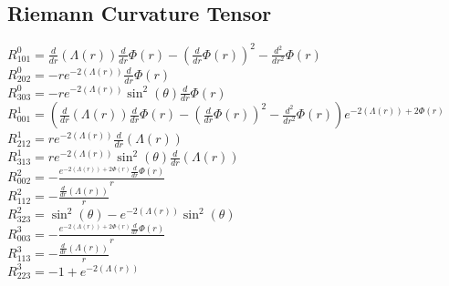 \documentclass{article}
\begin{document}
\subsection*{Riemann Curvature Tensor}
$R^0_{101}=\frac{d}{d r} \left(\Lambda{\left(r \right)}\right) \frac{d}{d r} \Phi{\left(r \right)} - \left(\frac{d}{d r} \Phi{\left(r \right)}\right)^{2} - \frac{d^{2}}{d r^{2}} \Phi{\left(r \right)}$\\
$R^0_{202}=- r e^{- 2 \left(\Lambda{\left(r \right)}\right)} \frac{d}{d r} \Phi{\left(r \right)}$\\
$R^0_{303}=- r e^{- 2 \left(\Lambda{\left(r \right)}\right)} \sin^{2}{\left(\theta \right)} \frac{d}{d r} \Phi{\left(r \right)}$\\
$R^1_{001}=\left(\frac{d}{d r} \left(\Lambda{\left(r \right)}\right) \frac{d}{d r} \Phi{\left(r \right)} - \left(\frac{d}{d r} \Phi{\left(r \right)}\right)^{2} - \frac{d^{2}}{d r^{2}} \Phi{\left(r \right)}\right) e^{- 2 \left(\Lambda{\left(r \right)}\right) + 2 \Phi{\left(r \right)}}$\\
$R^1_{212}=r e^{- 2 \left(\Lambda{\left(r \right)}\right)} \frac{d}{d r} \left(\Lambda{\left(r \right)}\right)$\\
$R^1_{313}=r e^{- 2 \left(\Lambda{\left(r \right)}\right)} \sin^{2}{\left(\theta \right)} \frac{d}{d r} \left(\Lambda{\left(r \right)}\right)$\\
$R^2_{002}=- \frac{e^{- 2 \left(\Lambda{\left(r \right)}\right) + 2 \Phi{\left(r \right)}} \frac{d}{d r} \Phi{\left(r \right)}}{r}$\\
$R^2_{112}=- \frac{\frac{d}{d r} \left(\Lambda{\left(r \right)}\right)}{r}$\\
$R^2_{323}=\sin^{2}{\left(\theta \right)} - e^{- 2 \left(\Lambda{\left(r \right)}\right)} \sin^{2}{\left(\theta \right)}$\\
$R^3_{003}=- \frac{e^{- 2 \left(\Lambda{\left(r \right)}\right) + 2 \Phi{\left(r \right)}} \frac{d}{d r} \Phi{\left(r \right)}}{r}$\\
$R^3_{113}=- \frac{\frac{d}{d r} \left(\Lambda{\left(r \right)}\right)}{r}$\\
$R^3_{223}=-1 + e^{- 2 \left(\Lambda{\left(r \right)}\right)}$\\
\end{document}
